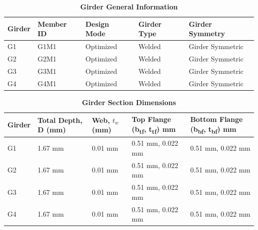 \documentclass[12pt,a4paper]{report}
\numberwithin{table}{chapter}
\numberwithin{figure}{chapter}
\begin{document}
\newpage

\vspace{0.4em}
\noindent

\vspace{4pt}
\begin{longtable}{|L{2.2cm}|L{1.8cm}|p{3.8cm}|p{3.8cm}|p{3.8cm}|}
\caption{\textbf{Girder General Information}}\\
\hline
\textbf{Girder} & \textbf{Member ID} & \textbf{Design Mode} & \textbf{Girder Type} & \textbf{Girder Symmetry} \\[6pt]
\hline
G1 & G1M1 & Optimized & Welded & Girder Symmetric \\[8pt]
\hline
G2 & G2M1 & Optimized & Welded & Girder Symmetric \\[8pt]
\hline
G3 & G3M1 & Optimized & Welded & Girder Symmetric \\[8pt]
\hline
G4 & G4M1 & Optimized & Welded & Girder Symmetric \\[8pt]
\hline
\end{longtable}

\vspace{0.6em}

\vspace{4pt}
\begin{longtable}{|L{1.8cm}|L{2.3cm}|L{1.8cm}|p{4.8cm}|p{4.8cm}|}
\caption{\textbf{Girder Section Dimensions}}\\
\hline
\textbf{Girder} & \textbf{Total Depth, D (mm)} & \textbf{Web, $t_w$ (mm)} & \textbf{Top Flange (b\textsubscript{tf}, t\textsubscript{tf}) mm} & \textbf{Bottom Flange (b\textsubscript{bf}, t\textsubscript{bf}) mm} \\[6pt]
\hline
G1 & 1.67 mm & 0.01 mm & 0.51 mm, 0.022 mm & 0.51 mm, 0.022 mm \\[8pt]
\hline
G2 & 1.67 mm & 0.01 mm & 0.51 mm, 0.022 mm & 0.51 mm, 0.022 mm \\[8pt]
\hline
G3 & 1.67 mm & 0.01 mm & 0.51 mm, 0.022 mm & 0.51 mm, 0.022 mm \\[8pt]
\hline
G4 & 1.67 mm & 0.01 mm & 0.51 mm, 0.022 mm & 0.51 mm, 0.022 mm \\[8pt]
\hline
\end{longtable}

\vspace{0.6em}
\end{document}
